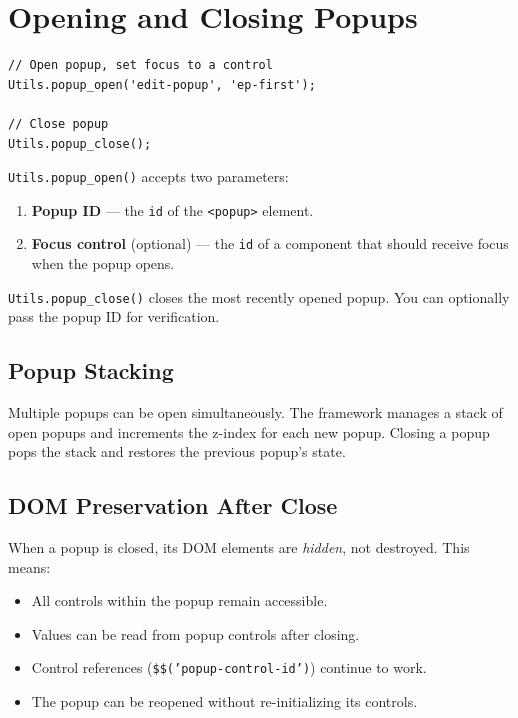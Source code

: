\section{Opening and Closing Popups}
\label{sec:popup-openclose}

\begin{lstlisting}[style=javascript]
// Open popup, set focus to a control
Utils.popup_open('edit-popup', 'ep-first');

// Close popup
Utils.popup_close();
\end{lstlisting}

\noindent
\texttt{Utils.popup\_open()} accepts two parameters:

\begin{enumerate}
  \item \textbf{Popup ID} --- the \texttt{id} of the \texttt{<popup>} element.
  \item \textbf{Focus control} (optional) --- the \texttt{id} of a component that should receive focus when the popup opens.
\end{enumerate}

\noindent
\texttt{Utils.popup\_close()} closes the most recently opened popup.  You can optionally pass the popup ID for verification.

\subsection{Popup Stacking}

Multiple popups can be open simultaneously.  The framework manages a stack of open popups and increments the z-index for each new popup.  Closing a popup pops the stack and restores the previous popup's state.

\subsection{DOM Preservation After Close}

When a popup is closed, its DOM elements are \emph{hidden}, not destroyed.  This means:

\begin{itemize}
  \item All controls within the popup remain accessible.
  \item Values can be read from popup controls after closing.
  \item Control references (\texttt{\$\$('popup-control-id')}) continue to work.
  \item The popup can be reopened without re-initializing its controls.
\end{itemize}

